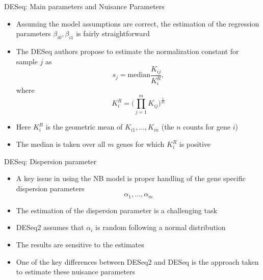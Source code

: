 \documentclass[xcolor=x11names,compress]{beamer}\usepackage[]{graphicx}\usepackage[]{color}
\begin{document}
\begin{frame}{DESeq: Main parameters and Nuisance Parameters}
  \begin{itemize}
   \item Assuming the model assumptions are correct, the estimation of the regression parameters $\beta_{i0},\beta_{i1}$
         is fairly straightforward
   \item The DESeq authors propose to estimate the normalization constant for sample $j$ as
     \begin{equation*}
       s_j =\mathrm{median} \frac{K_{ij}}{K_i^R},
     \end{equation*}
     where 
     \begin{equation*}
       K_i^R=\bigg(\prod_{j=1}^m K_{ij} \bigg)^{\frac{1}{m}}
     \end{equation*}
   \item Here $K_i^R$ is the geometric mean of $K_{i1},\ldots,K_{in}$ (the $n$ counts for gene $i$)
   \item The median is taken over all $m$ genes for which $K_i^R$ is positive
  \end{itemize}
\end{frame}

\begin{frame}{DESeq: Dispersion parameter}
  \begin{itemize}
  \item A key issue in using the NB model is proper handling of the gene specific dispersion parameters
    \begin{equation*}
       \alpha_{1},\ldots,\alpha_{m}
    \end{equation*}
  \item The estimation of the dispersion parameter is a challenging task
  \item DESeq2 assumes that $\alpha_i$ is random following a normal distribution
  \item The results are sensitive to the estimates
  \item One of the key differences between DESeq2 and DESeq is the approach taken to estimate these nuisance 
    parameters
  \end{itemize}
\end{frame}
\end{document}
